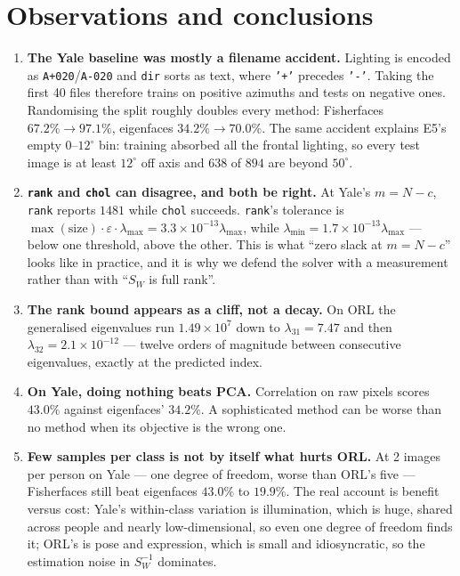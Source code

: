 \documentclass[11pt]{article}
\newcommand{\Sw}{S_W}
\begin{document}
\section{Observations and conclusions}
\label{sec:obs}

\begin{enumerate}[leftmargin=1.3em,itemsep=2pt]

\item \textbf{The Yale baseline was mostly a filename accident.} Lighting is
encoded as \texttt{A+020}/\texttt{A-020} and \texttt{dir} sorts as text, where
\texttt{'+'} precedes \texttt{'-'}. Taking the first 40 files therefore trains
on positive azimuths and tests on negative ones. Randomising the split roughly
doubles every method: Fisherfaces $67.2\%\to97.1\%$, eigenfaces
$34.2\%\to70.0\%$. The same accident explains E5's empty $0$--$12^\circ$ bin:
training absorbed all the frontal lighting, so every test image is at least
$12^\circ$ off axis and $638$ of $894$ are beyond $50^\circ$.

\item \textbf{\texttt{rank} and \texttt{chol} can disagree, and both be right.}
At Yale's $m=N-c$, \texttt{rank} reports $1481$ while \texttt{chol} succeeds.
\texttt{rank}'s tolerance is $\max(\text{size})\cdot\varepsilon\cdot\lambda_{\max}
=3.3\times10^{-13}\lambda_{\max}$, while $\lambda_{\min}=1.7\times10^{-13}\lambda_{\max}$
--- below one threshold, above the other. This is what ``zero slack at
$m=N-c$'' looks like in practice, and it is why we defend the solver with a
measurement rather than with ``$\Sw$ is full rank''.

\item \textbf{The rank bound appears as a cliff, not a decay.} On ORL the
generalised eigenvalues run $1.49\times10^{7}$ down to $\lambda_{31}=7.47$ and
then $\lambda_{32}=2.1\times10^{-12}$ --- twelve orders of magnitude between
consecutive eigenvalues, exactly at the predicted index.

\item \textbf{On Yale, doing nothing beats PCA.} Correlation on raw pixels
scores $43.0\%$ against eigenfaces' $34.2\%$. A sophisticated method can be
worse than no method when its objective is the wrong one.

\item \textbf{Few samples per class is not by itself what hurts ORL.} At 2
images per person on Yale --- one degree of freedom, worse than ORL's five ---
Fisherfaces still beat eigenfaces $43.0\%$ to $19.9\%$. The real account is
benefit versus cost: Yale's within-class variation is illumination, which is
huge, shared across people and nearly low-dimensional, so even one degree of
freedom finds it; ORL's is pose and expression, which is small and
idiosyncratic, so the estimation noise in $\Sw^{-1}$ dominates.


\end{enumerate}
\end{document}
